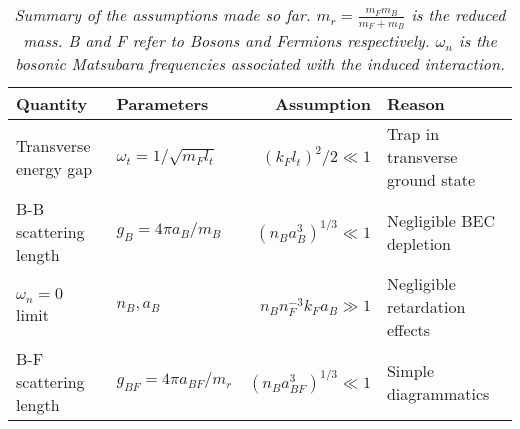 \begin{table}[htb]
\centering
\caption{\textit{Summary of the assumptions made so far. $m_r = \frac{m_Fm_B}{m_F+m_B}$ is the reduced mass. B and F refer to Bosons and Fermions respectively. $\omega_n$ is the bosonic Matsubara frequencies associated with the induced interaction.}}
\begin{tabular}{|l|l|r|l|}
\hline \textbf{Quantity} & \textbf{Parameters} 				& \textbf{Assumption}					& \textbf{Reason}	\\
\hline Transverse energy gap & $\omega_t = 1/\sqrt{m_Fl_t}$ & $(k_Fl_t)^2/2 	\ll 1$ 				& Trap in transverse ground state \\
\hline B-B scattering length & $g_B = 4\pi a_B/m_B$			& $(n_Ba_B^3)^{1/3}	\ll 1$				& Negligible BEC depletion  \\
\hline $\omega_n = 0$ limit  & $n_B, a_B$					& $n_Bn_F^{-3}k_Fa_B	\gg 1$		& Negligible retardation effects  \\
\hline B-F scattering length & $g_{BF} = 4\pi a_{BF}/m_r$ 	& $(n_Ba_{BF}^3)^{1/3}	\ll 1$			& Simple diagrammatics\\
\hline 
\end{tabular}
\label{tab.assumptions}
\end{table}

